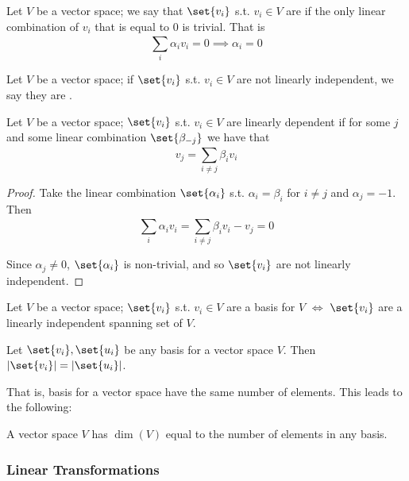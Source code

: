 \documentclass{article}
\begin{document}
\begin{definition}
  Let $V$ be a vector space; we say that $\set{v_i}$ s.t. $v_i \in V$ are  if the only linear combination of $v_i$ that is equal to $0$ is trivial. That is
  \[
    \sum^{}_{i} \alpha_i v_i = 0 \implies \alpha_i = 0
  \]
\end{definition}

\begin{definition}
  Let $V$ be a vector space; if $\set{v_i}$ s.t. $v_i \in V$ are not linearly independent, we say they are .
\end{definition}

\begin{theorem}
  Let $V$ be a vector space; $\set{v_i}$ s.t. $v_i \in V$ are linearly dependent if for some $j$ and some linear combination $\set{\beta_{-j}}$ we have that
  \[
    v_j = \sum^{}_{i \ne j} \beta_i v_i
  \]
\end{theorem}

\begin{proof}
  Take the linear combination $\set{\alpha_i}$ s.t. $\alpha_i = \beta_i$ for $i \ne j$ and $\alpha_j = -1$. Then
  \[
    \sum^{}_{i} \alpha_i v_i
    =
    \sum^{}_{i \ne j} \beta_i v_i - v_j
    =
    0
  \]

  Since $\alpha_j \ne 0$, $\set{\alpha_i}$ is non-trivial, and so $\set{v_i}$ are not linearly independent.
\end{proof}

\begin{theorem}
  Let $V$ be a vector space; $\set{v_i}$ s.t. $v_i \in V$ are a basis for $V$ $\iff$ $\set{v_i}$ are a linearly independent spanning set of $V$.
\end{theorem}

\begin{claim}
  Let $\set{v_i}, \set{u_i}$ be any basis for a vector space $V$. Then $|\set{v_i}| = |\set{u_i}|$.
\end{claim}

That is, basis for a vector space have the same number of elements. This leads to the following:
\begin{definition}
  A vector space $V$ has  $\dim(V)$ equal to the number of elements in any basis.
\end{definition}

\subsubsection{Linear Transformations}
\label{ssub:linear_transformations}
\end{document}
